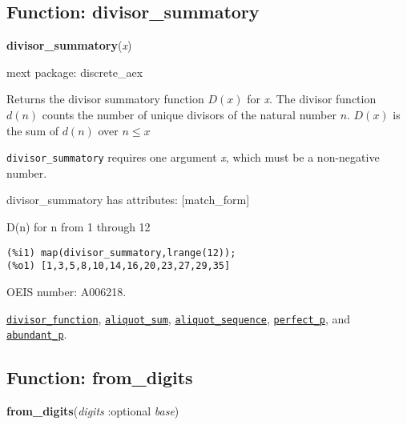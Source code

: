 \documentclass[]{article}
\begin{document}
\vspace{5 pt}


\subsection{Function: divisor\_summatory\label{sec:divisor_summatory}}
\hypertarget{divisor_summatory}{}
{\bf divisor\_summatory}({\it x})


\noindent mext package: discrete\_aex



\vspace{5 pt}
Returns the divisor summatory function $D(x)$ for {\it x}. The divisor function $d(n)$ counts the number of unique divisors of the natural number $n$. $D(x)$ is the sum of $d(n)$ over $n \le x$ 

\vspace{5 pt}

   {\tt divisor\_summatory} requires one argument {\it x}, which must be a non-negative number.


\vspace{5 pt}

divisor\_summatory has attributes: [match\_form]

\vspace{5 pt}


   D(n) for n from 1 through 12 

\begin{Verbatim}[frame=single]
(%i1) map(divisor_summatory,lrange(12));
(%o1) [1,3,5,8,10,14,16,20,23,27,29,35]
\end{Verbatim}


OEIS number: A006218.


  \hyperlink{divisor_function}{{\tt divisor\_function}}, \hyperlink{aliquot_sum}{{\tt aliquot\_sum}}, \hyperlink{aliquot_sequence}{{\tt aliquot\_sequence}}, \hyperlink{perfect_p}{{\tt perfect\_p}}, and \hyperlink{abundant_p}{{\tt abundant\_p}}.

\vspace{5 pt}


\subsection{Function: from\_digits\label{sec:from_digits}}
\hypertarget{from_digits}{}
{\bf from\_digits}({\it digits} :optional {\it base})
\end{document}
